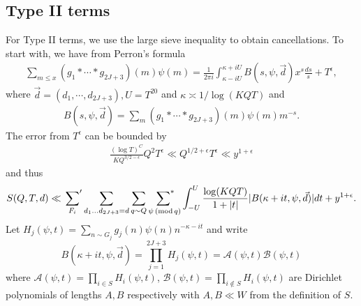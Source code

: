 \documentclass[oneside, 12pt]{amsart}
\theoremstyle{definition}
\renewcommand{\pmod}[1]{\,(\textup{mod}\,#1)}
\newcommand{\mc}{\mathcal}
\begin{document}
\subsection{Type II terms} For Type II terms, we use the large sieve inequality to obtain cancellations.  To start with, we have from Perron's formula 
	\begin{align*}
	\sum_{m\leq x}{(g_1* \cdots * g_{2J+3})(m)\psi(m)}=\frac{1}{2\pi i}\int_{\kappa-iU}^{\kappa+iU} B(s, \psi, \vec{d})x^s \frac{ds}{s}+T^\epsilon,
	\end{align*}
	where $\vec{d}=(d_1, \cdots, d_{2J+3}), U=T^{20}$ and $\kappa\asymp 1/\log (KQT)$ and 
	\begin{align*}
	B(s, \psi, \vec{d})=\sum_{m}(g_1*\cdots * g_{2J+3})(m)\psi(m)m^{-s}.
	\end{align*}
	The error from $T^\epsilon$ can be bounded by
	\begin{align}\label{Type2ErrorPerron}
	\frac{(\log T)^C }{KQ^{3/2-\epsilon}}Q^2 T^\epsilon\ll Q^{1/2+\epsilon}T^\epsilon\ll y^{1+\epsilon}
	\end{align}
and thus 
\begin{equation}
\label{SQ bound}
S(Q,T,d)\ll 
\sideset{}{'}\sum_{F_i}\sum_{d_1\ldots d_{2J+3}=d}\sum_{q\sim Q}\sideset{}{^*}\sum_{\,\,\psi \pmod q}\int_{-U}^{U}\frac{\log(KQT)}{1+|t|}|B(\kappa+it,\psi,\vec{d})| dt 
+
y^{1+\epsilon}.
\end{equation}
Let $H_j( \psi ,t)=\sum_{n\sim G_j}g_j(n)\psi(n)n^{-\kappa-it}$ and write
\[B(\kappa+it,\psi,\vec{d})=\prod_{j=1}^{2J+3}H_{j}(\psi,t)=\mathcal{A}(\psi, t)\mathcal{B}(\psi, t)\]
where $\mathcal{A}(\psi, t)=\prod_{i\in S}H_i(\psi, t)$, $\mathcal{B}(\psi, t)=\prod_{i\not \in S}H_i(\psi, t)$ are Dirichlet polynomials of lengths $A, B$ respectively with $A, B\ll W$ from the definition of $S$. 

%
%
\end{document}
